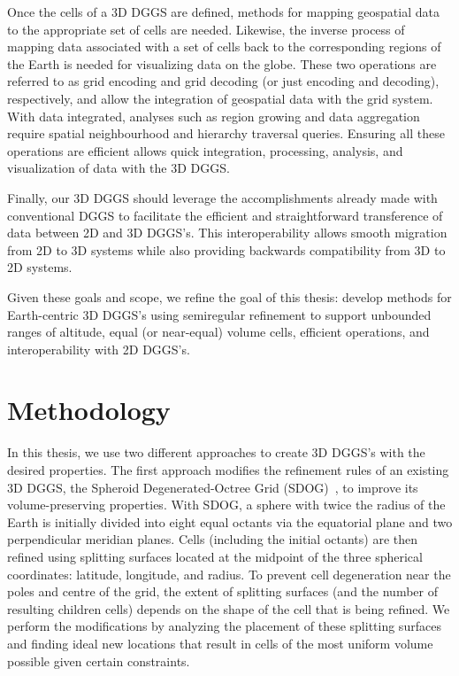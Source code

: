 Once the cells of a 3D DGGS are defined, methods for mapping geospatial data to the appropriate set of cells are needed.
Likewise, the inverse process of mapping data associated with a set of cells back to the corresponding regions of the Earth is needed for visualizing data on the globe.
These two operations are referred to as grid encoding and grid decoding (or just encoding and decoding), respectively, and allow the integration of geospatial data with the grid system.
With data integrated, analyses such as region growing and data aggregation require spatial neighbourhood and hierarchy traversal queries.
Ensuring all these operations are efficient allows quick integration, processing, analysis, and visualization of data with the 3D DGGS.


Finally, our 3D DGGS should leverage the accomplishments already made with conventional DGGS to facilitate the efficient and straightforward transference of data between 2D and 3D DGGS's. This interoperability allows smooth migration from 2D to 3D systems while also providing backwards compatibility from 3D to 2D systems.


Given these goals and scope, we refine the goal of this thesis: develop methods for Earth-centric 3D DGGS's using semiregular refinement to support unbounded ranges of altitude, equal (or near-equal) volume cells, efficient operations, and interoperability with 2D DGGS's.


\section{Methodology}
In this thesis, we use two different approaches to create 3D DGGS's with the desired properties.
The first approach modifies the refinement rules of an existing 3D DGGS, the Spheroid Degenerated-Octree Grid (SDOG)~\cite{yu2009sdog}, to improve its volume-preserving properties.
With SDOG, a sphere with twice the radius of the Earth is initially divided into eight equal octants via the equatorial plane and two perpendicular meridian planes.
Cells (including the initial octants) are then refined using splitting surfaces located at the midpoint of the three spherical coordinates: latitude, longitude, and radius.
To prevent cell degeneration near the poles and centre of the grid, the extent of splitting surfaces (and the number of resulting children cells) depends on the shape of the cell that is being refined.
We perform the modifications by analyzing the placement of these splitting surfaces and finding ideal new locations that result in cells of the most uniform volume possible given certain constraints.


